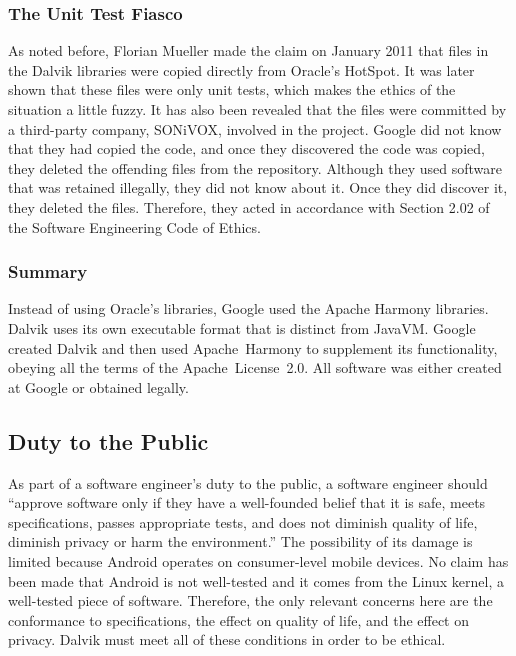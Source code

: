 \documentclass[11pt]{article}
\begin{document}
\begin{multicols}{2}
\subsubsection{The Unit Test Fiasco} %
\label{ssub:unittest-fiasco}

As noted before, Florian Mueller made the claim on January 2011 that files in
the Dalvik libraries were copied directly from Oracle's HotSpot.  It was later
shown that these files were only unit tests, which makes the ethics of the
situation a little fuzzy.  It has also been revealed that the files were
committed by a third-party company, SONiVOX, involved in the project.  Google
did not know that they had copied the code, and once they discovered the code
was copied, they deleted the offending files from the repository.  Although they
used software that was retained illegally, they did not know about it.  Once
they did discover it, they deleted the files.  Therefore, they acted in
accordance with Section 2.02 of the Software Engineering Code of Ethics.


\subsubsection{Summary} %
\label{ssub:licensing-summary}

Instead of using Oracle's libraries, Google used the Apache Harmony libraries.
Dalvik uses its own executable format that is distinct from JavaVM.  Google
created Dalvik and then used Apache~Harmony to supplement its functionality,
obeying all the terms of the Apache~License~2.0.  All software was either
created at Google or obtained legally.



\subsection{Duty to the Public} %
\label{sub:public}

As part of a software engineer's duty to the public, a software engineer should
``approve software only if they have a well-founded belief that it is safe,
meets specifications, passes appropriate tests, and does not diminish quality of
life, diminish privacy or harm the environment.'' \cite[\S~1.03]{secode}  The
possibility of its damage is limited because Android operates on consumer-level
mobile devices.  No claim has been made that Android is not well-tested and it
comes from the Linux kernel, a well-tested piece of software.  Therefore, the
only relevant concerns here are the conformance to specifications, the effect on
quality of life, and the effect on privacy.  Dalvik must meet all of these
conditions in order to be ethical.


\end{multicols}
\end{document}
